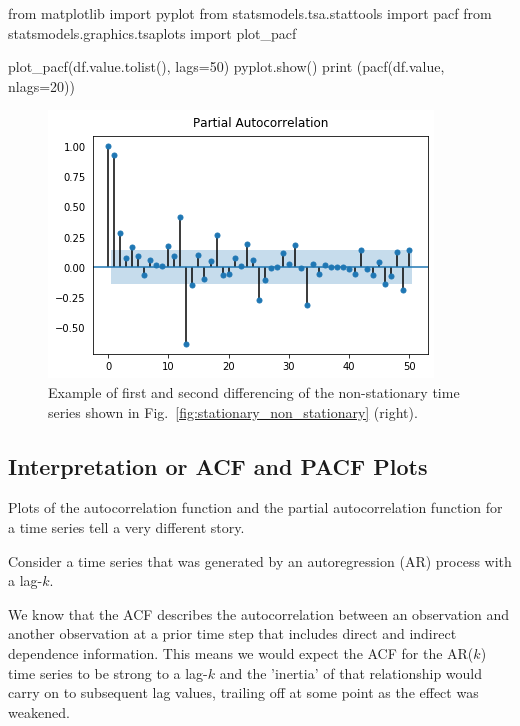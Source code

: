 \begin{ipython}
from matplotlib import pyplot
from statsmodels.tsa.stattools import pacf
from statsmodels.graphics.tsaplots import plot_pacf

plot_pacf(df.value.tolist(), lags=50)
pyplot.show()
print (pacf(df.value, nlags=20))	
\end{ipython}
\begin{ioutput}
[ 1.          0.92510297  0.28297106  0.0759758   0.16921494  0.09370324
 -0.06396075  0.0560044   0.01650882  0.00431904  0.17496764  0.08742467
  0.41635623 -0.63684013 -0.15223434  0.10337984 -0.10246178  0.04619914
  0.26331492 -0.06447131 -0.05881505]
\end{ioutput}

\begin{figure}[htb]
	\centering
	\includegraphics[width=0.7\linewidth]{figures/pacf_plot.png}
	\caption{Example of first and second differencing of the non-stationary time series shown in Fig.~\ref{fig:stationary_non_stationary} (right).}
	\label{fig:pacf}
\end{figure}
    
\subsection{Interpretation or ACF and PACF Plots}
\label{intuition-for-acf-and-pacf-plots}

Plots of the autocorrelation function and the partial autocorrelation function for a time series tell a very different story. 

Consider a time series that was generated by an autoregression (AR) process with a lag-\(k\).

We know that the ACF describes the autocorrelation between an observation and another observation at a prior time step that includes direct and indirect dependence information. This means we would expect the ACF for the AR(\(k\)) time series to be strong to a lag-\(k\) and the 'inertia' of that relationship would carry on to subsequent lag values, trailing off at some point as the effect was weakened.


